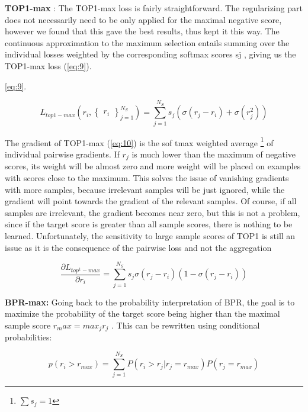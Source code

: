 \textbf{TOP1-max} : The TOP1-max loss is fairly straightforward. The regularizing part does not necessarily need to be only applied for the maximal negative score, however we found that this gave the
best results, thus kept it this way. The continuous approximation to the maximum selection entails
summing over the individual losses weighted by the corresponding softmax scores sj , giving us the
TOP1-max loss (\ref{eq:9}).

\ref{eq:9}.

\begin{equation}\label{eq:9}
    L_{top1 - max}\left ( r_i,\begin{Bmatrix}
r_i
\end{Bmatrix}_{j=1}^{N_S} \right )= \sum_{j=1}^{N_S} s_j \left ( \sigma (r_j - r_i) + \sigma (r^2_j) \right )
\end{equation}


The gradient of TOP1-max (\ref{eq:10}) is the sof tmax weighted average \footnote[7]{$\sum s_j = 1$} of individual pairwise gradients.
If $r_j$ is much lower than the maximum of negative scores, its weight will be almost zero and more
weight will be placed on examples with scores close to the maximum. This solves the issue of
vanishing gradients with more samples, because irrelevant samples will be just ignored, while the
gradient will point towards the gradient of the relevant samples. Of course, if all samples are irrelevant, the gradient becomes near zero, but this is not a problem, since if the target score is greater
than all sample scores, there is nothing to be learned. Unfortunately, the sensitivity to large sample
scores of TOP1 is still an issue as it is the consequence of the pairwise loss and not the aggregation


\begin{equation}\label{eq:10}
  \frac{\partial L_{top^1 - max}}{\partial r_i} = \sum_{j=1}^{N_S} s_j\sigma(r_j - r_i)(1 - \sigma(r_j - r_i))
  \end{equation}



\textbf{BPR-max:} Going back to the probability interpretation of BPR, the goal is to maximize the probability of the target score being higher than the maximal sample score $r_max = max_j r_j$ . This can be
rewritten using conditional probabilities:

\begin{equation}\label{eq:11}
  p\left ( r_i  > r_{max} \right ) = \sum_{j=1}^{N_S} P\left ( r_i > r_j | r_j = r_{max} \right ) P (r_j = r_{max})
  \end{equation}



